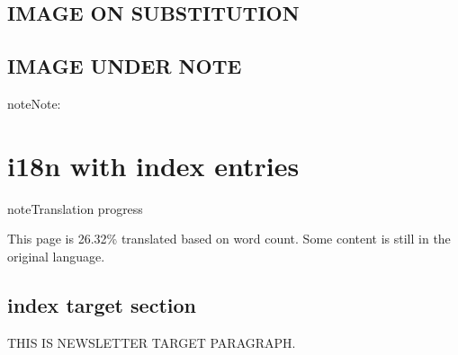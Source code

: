 \documentclass[letterpaper,10pt,english]{sphinxmanual}
\begin{document}
\begin{figure}[htbp]
\centering

\noindent{}
\end{figure}


\section{IMAGE ON SUBSTITUTION}
\label{\detokenize{figure:image-on-substitution}}

\section{IMAGE UNDER NOTE}
\label{\detokenize{figure:image-under-note}}
\begin{sphinxadmonition}{note}{Note:}
\noindent{}

\begin{figure}[H]
\centering

\noindent{}
\end{figure}
\end{sphinxadmonition}

\sphinxstepscope


\chapter{i18n with index entries}
\label{\detokenize{index_entries:i18n-with-index-entries}}\label{\detokenize{index_entries::doc}}
\begin{sphinxadmonition}{note}{Translation progress}

\sphinxAtStartPar
This page is 26.32\% translated based on word count. Some content is still in the original language.
\end{sphinxadmonition}

\ignorespaces 

\section{index target section}
\label{\detokenize{index_entries:index-target-section}}\label{\detokenize{index_entries:index-0}}
\sphinxAtStartPar
THIS IS NEWSLETTER TARGET PARAGRAPH.
\end{document}
